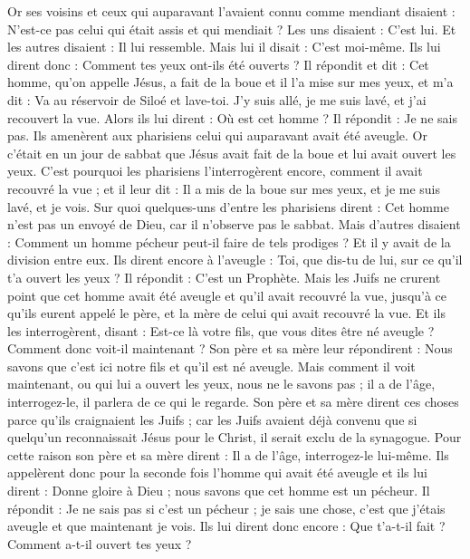 \begin{multicols}{2}
Or ses voisins et ceux qui auparavant l'avaient connu comme mendiant disaient : N'est-ce pas celui qui était assis et qui mendiait ?
Les uns disaient : C'est lui. Et les autres disaient : Il lui ressemble. Mais lui il disait : C'est moi-même.
Ils lui dirent donc : Comment tes yeux ont-ils été ouverts ?
Il répondit et dit : Cet homme, qu'on appelle Jésus, a fait de la boue et il l'a mise sur mes yeux, et m'a dit : Va au réservoir de Siloé et lave-toi. J'y suis allé, je me suis lavé, et j'ai recouvert la vue.
Alors ils lui dirent : Où est cet homme ? Il répondit : Je ne sais pas.
Ils amenèrent aux pharisiens celui qui auparavant avait été aveugle.
Or c'était en un jour de sabbat que Jésus avait fait de la boue et lui avait ouvert les yeux.
C'est pourquoi les pharisiens l'interrogèrent encore, comment il avait recouvré la vue ; et il leur dit : Il a mis de la boue sur mes yeux, et je me suis lavé, et je vois.
Sur quoi quelques-uns d'entre les pharisiens dirent : Cet homme n'est pas un envoyé de Dieu, car il n'observe pas le sabbat. Mais d'autres disaient : Comment un homme pécheur peut-il faire de tels prodiges ? Et il y avait de la division entre eux.
Ils dirent encore à l'aveugle : Toi, que dis-tu de lui, sur ce qu'il t'a ouvert les yeux ? Il répondit : C'est un Prophète.
Mais les Juifs ne crurent point que cet homme avait été aveugle et qu'il avait recouvré la vue, jusqu'à ce qu'ils eurent appelé le père, et la mère de celui qui avait recouvré la vue.
Et ils les interrogèrent, disant : Est-ce là votre fils, que vous dites être né aveugle ? Comment donc voit-il maintenant ?
Son père et sa mère leur répondirent : Nous savons que c'est ici notre fils et qu'il est né aveugle.
Mais comment il voit maintenant, ou qui lui a ouvert les yeux, nous ne le savons pas ; il a de l'âge, interrogez-le, il parlera de ce qui le regarde.
Son père et sa mère dirent ces choses parce qu'ils craignaient les Juifs ; car les Juifs avaient déjà convenu que si quelqu'un reconnaissait Jésus pour le Christ, il serait exclu de la synagogue.
Pour cette raison son père et sa mère dirent : Il a de l'âge, interrogez-le lui-même.
Ils appelèrent donc pour la seconde fois l'homme qui avait été aveugle et ils lui dirent : Donne gloire à Dieu ; nous savons que cet homme est un pécheur.
Il répondit : Je ne sais pas si c'est un pécheur ; je sais une chose, c'est que j'étais aveugle et que maintenant je vois.
Ils lui dirent donc encore : Que t'a-t-il fait ? Comment a-t-il ouvert tes yeux ?

\end{multicols}
